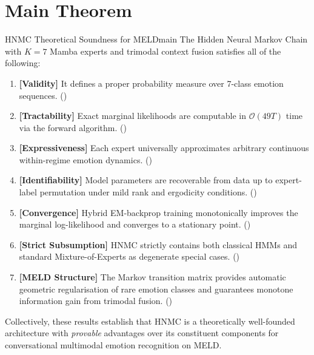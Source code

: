 \documentclass[11pt, a4paper]{article}
\begin{document}
\section{Main Theorem}

\begin{theorem}{HNMC Theoretical Soundness for MELD}{main}
The Hidden Neural Markov Chain with $K=7$ Mamba experts and trimodal context
fusion satisfies all of the following:
\begin{enumerate}[label=\textbf{(\arabic*)}, leftmargin=2.2em]
  \item \textbf{[Validity]}\;
        It defines a proper probability measure over 7-class emotion sequences.
        \textup{()}
  \item \textbf{[Tractability]}\;
        Exact marginal likelihoods are computable in $\mathcal{O}(49T)$ time
        via the forward algorithm.
        \textup{()}
  \item \textbf{[Expressiveness]}\;
        Each expert universally approximates arbitrary continuous within-regime
        emotion dynamics.
        \textup{()}
  \item \textbf{[Identifiability]}\;
        Model parameters are recoverable from data up to expert-label
        permutation under mild rank and ergodicity conditions.
        \textup{()}
  \item \textbf{[Convergence]}\;
        Hybrid EM-backprop training monotonically improves the marginal
        log-likelihood and converges to a stationary point.
        \textup{()}
  \item \textbf{[Strict Subsumption]}\;
        HNMC strictly contains both classical HMMs and standard
        Mixture-of-Experts as degenerate special cases.
        \textup{()}
  \item \textbf{[MELD Structure]}\;
        The Markov transition matrix provides automatic geometric regularisation
        of rare emotion classes and guarantees monotone information gain from
        trimodal fusion.
        \textup{()}
\end{enumerate}
Collectively, these results establish that HNMC is a theoretically
well-founded architecture with \emph{provable} advantages over its constituent
components for conversational multimodal emotion recognition on MELD.
\end{theorem}
\end{document}
